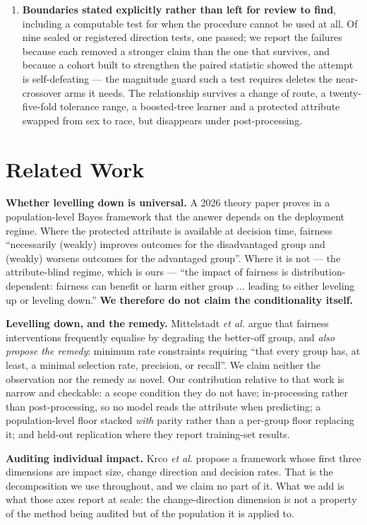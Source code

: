 \documentclass[9pt,conference]{IEEEtran}
\begin{document}
\begin{enumerate}
\item \textbf{Boundaries stated explicitly rather than left for review to find}, including a
computable test for when the procedure cannot be used at all. Of nine sealed or registered
direction tests, one passed; we report the failures because each removed a stronger claim
than the one that survives, and because a cohort built to strengthen the paired statistic
showed the attempt is self-defeating --- the magnitude guard such a test requires deletes
the near-crossover arms it needs. The relationship survives a change of route, a
twenty-five-fold tolerance range, a boosted-tree learner and a protected attribute swapped
from sex to race, but disappears under post-processing.
\end{enumerate}

\section{Related Work}
\label{sec:related}


\textbf{Whether levelling down is universal.} A 2026 theory paper \cite{backfire2026} proves in
a population-level Bayes framework that the answer depends on the deployment regime. Where the
protected attribute is available at decision time, fairness ``necessarily (weakly) improves
outcomes for the disadvantaged group and (weakly) worsens outcomes for the advantaged group''.
Where it is not --- the attribute-blind regime, which is ours --- ``the impact of fairness is
distribution-dependent: fairness can benefit or harm either group $\ldots$ leading to either
leveling up or leveling down.'' \textbf{We therefore do not claim the conditionality itself.}

\textbf{Levelling down, and the remedy.} Mittelstadt \emph{et al.} \cite{mittelstadt2023} argue
that fairness interventions frequently equalise by degrading the better-off group, and
\emph{also propose the remedy}: minimum rate constraints requiring ``that every group has, at
least, a minimal selection rate, precision, or recall''. We claim neither the observation nor
the remedy as novel. Our contribution relative to that work is narrow and checkable: a scope
condition they do not have; in-processing rather than post-processing, so no model reads the
attribute when predicting; a population-level floor stacked \emph{with} parity rather than a
per-group floor replacing it; and held-out replication where they report training-set results.

\textbf{Auditing individual impact.} Krco \emph{et al.} \cite{ferry2023} propose a framework
whose first three dimensions are impact size, change direction and decision rates. That is the
decomposition we use throughout, and we claim no part of it. What we add is what those axes
report at scale: the change-direction dimension is not a property of the method being audited
but of the population it is applied to.
\end{document}
